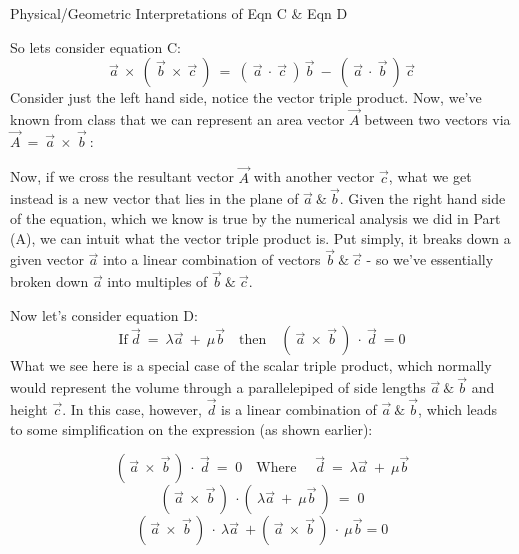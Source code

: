 \documentclass[12pt,letterpaper, onecolumn]{exam}
\begin{document}
\begin{questions}
    
\question[Part B] Physical/Geometric Interpretations of Eqn C \& Eqn D\droppoints

\begin{solution}
    So lets consider equation C:
    \begin{equation}
        \vec{a}\ \times\ (\ \vec{b}\ \times\ \vec{c}\ )\ =\ (\ \vec{a}\ \cdot\ \vec{c}\ )\,\vec{b}\ -\ (\ \vec{a}\ \cdot\ \vec{b}\ )\,\vec{c}
    \end{equation}
    Consider just the left hand side, notice the vector triple product. Now, we've known from class that we can represent an area vector $\vec{A}$ between two vectors via $\vec{A}\ =\ \vec{a}\ \times\ \vec{b}\ $:

    Now, if we cross the resultant vector $\vec{A}$ with another vector $\vec{c}$, what we get instead is a new vector that lies in the plane of ${\vec{a}\ \&\ \vec{b}}$. Given the right hand side of the equation, which we know is true by the numerical analysis we did in Part (A), we can intuit what the vector triple product is. Put simply, it breaks down a given vector $\vec{a}$ into a linear combination of vectors $\vec{b}\ \&\ \vec{c}$ - so we've essentially broken down $\vec{a}$ into multiples of $\vec{b}\ \&\ \vec{c}$.

\newpage
    Now let's consider equation D:
    \begin{equation}
        \text{If}\ \vec{d}\ =\ \lambda\vec{a}\ +\ \mu\vec{b}\quad\text{then{}}\quad(\ \vec{a}\ \times\ \vec{b}\ )\ \cdot\ \vec{d}\ = 0
    \end{equation}
    What we see here is a special case of the scalar triple product, which normally would represent the volume through a parallelepiped of side lengths $\vec{a}\ \&\ \vec{b}$ and height $\vec{c}$. In this case, however, $\vec{d}$ is a linear combination of $\vec{a}\ \&\ \vec{b}$, which leads to some simplification on the expression (as shown earlier):

    \begin{equation}
                    (\,\vec{a}\ \times\ \vec{b}\,)\ \cdot \ \vec{d}\ = \;0
                    \quad\text{Where }\quad \vec{d}\ =\ \lambda \vec{a} \ + \ \mu \vec{b}
                \end{equation}
        \begin{equation}
            (\,\vec{a}\ \times\ \vec{b}\,)\ \cdot (\ \lambda \vec{a} \ + \ \mu \vec{b}\ )\ = \;0
        \end{equation}
        \begin{equation}
            (\,\vec{a}\ \times\ \vec{b}\,)\ \cdot \ \lambda \vec{a} \ + (\,\vec{a}\ \times\ \vec{b}\,)\ \cdot \ \mu \vec{b}=0
    \end{equation}


\end{solution}
\end{questions}
\end{document}
